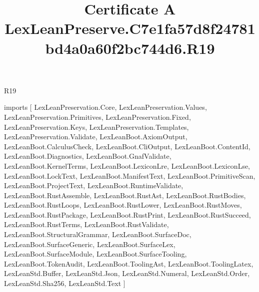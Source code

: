 \begin{lexlean}{R19}
\title{Certificate A LexLeanPreserve.C7e1fa57d8f24781bd4a0a60f2bc744d6.R19}
\begin{coremodule}
imports [
  LexLeanPreservation.Core,
  LexLeanPreservation.Values,
  LexLeanPreservation.Primitives,
  LexLeanPreservation.Fixed,
  LexLeanPreservation.Keys,
  LexLeanPreservation.Templates,
  LexLeanPreservation.Validate,
  LexLeanBoot.AxiomOutput,
  LexLeanBoot.CalculusCheck,
  LexLeanBoot.CliOutput,
  LexLeanBoot.ContentId,
  LexLeanBoot.Diagnostics,
  LexLeanBoot.GnafValidate,
  LexLeanBoot.KernelTerms,
  LexLeanBoot.LexiconLre,
  LexLeanBoot.LexiconLse,
  LexLeanBoot.LockText,
  LexLeanBoot.ManifestText,
  LexLeanBoot.PrimitiveScan,
  LexLeanBoot.ProjectText,
  LexLeanBoot.RuntimeValidate,
  LexLeanBoot.RustAssemble,
  LexLeanBoot.RustAst,
  LexLeanBoot.RustBodies,
  LexLeanBoot.RustLoops,
  LexLeanBoot.RustLower,
  LexLeanBoot.RustMoves,
  LexLeanBoot.RustPackage,
  LexLeanBoot.RustPrint,
  LexLeanBoot.RustSucceed,
  LexLeanBoot.RustTerms,
  LexLeanBoot.RustValidate,
  LexLeanBoot.StructuralGrammar,
  LexLeanBoot.SurfaceDoc,
  LexLeanBoot.SurfaceGeneric,
  LexLeanBoot.SurfaceLex,
  LexLeanBoot.SurfaceModule,
  LexLeanBoot.SurfaceTooling,
  LexLeanBoot.TokenAudit,
  LexLeanBoot.ToolingAst,
  LexLeanBoot.ToolingLatex,
  LexLeanStd.Buffer,
  LexLeanStd.Json,
  LexLeanStd.Numeral,
  LexLeanStd.Order,
  LexLeanStd.Sha256,
  LexLeanStd.Text
]


\end{coremodule}
\end{lexlean}
